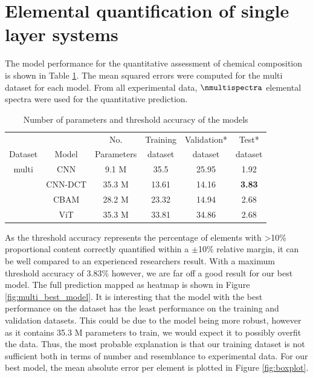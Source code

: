 \section{Elemental quantification of single layer systems}

The model performance for the quantitative assessment of chemical composition is shown in Table \ref{tab:acc_quant}. The mean squared errors were computed for the multi dataset for each model.
From all experimental data, $\nmultispectra$ elemental spectra were used for the quantitative prediction. 

\begin{table}[H]
    \centering
    \begin{tabular}{c|c|c|c|c|c}
        &    & No.  & Training & Validation*  & Test*    \\
         Dataset   & Model&Parameters &                           dataset & dataset & dataset         \\
        \hline
        multi  & CNN     &   9.1 M        &     35.5       &   25.95                 &  1.92      \\
               & CNN-DCT &  35.3 M        &    13.61          &    14.16            &   \textbf{3.83}   \\
               & CBAM    & 28.2 M         &    23.32         &    14.94             &  2.68   \\ %
               & ViT     &   35.3 M     &    33.81       &      34.86    &   2.68        \\
    \end{tabular}
    \caption{Number of parameters and threshold accuracy of the models}
    \label{tab:acc_quant}
\end{table}

As the threshold accuracy represents the percentage of elements with >10\% proportional content correctly quantified within a $\pm$10\% relative margin, it can be well compared to an experienced researchers result. With a maximum threshold accuracy of 3.83\% however, we are far off a good result for our best model. The full prediction mapped as heatmap is shown in Figure \ref{fig:multi_best_model}. It is interesting that the model with the best performance on the dataset has the least performance on the training and validation datasets. This could be due to the model being more robust, however as it contains 35.3 M parameters to train, we would expect it to possibly overfit the data. Thus, the most probable explanation is that our training dataset is not sufficient both in terms of number and resemblance to experimental data. For our best model, the mean absolute error per element is plotted in Figure \ref{fig:boxplot}.

